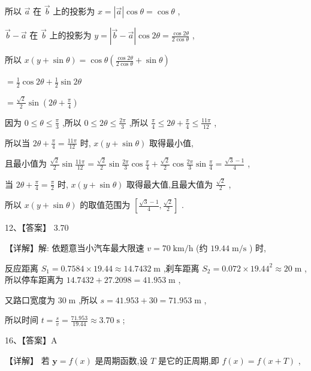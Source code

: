 \documentclass[10pt]{article}
\newcommand*\circled[1]{\tikz[baseline=(char.base)]{\node[shape=circle,draw,inner sep=1.5pt] (char) {\small #1};}}
\begin{document}
所以 \(\overrightarrow{a}\) 在 \(\overrightarrow{b}\) 上的投影为 \(x = \left| \overrightarrow{a}\right| \cos \theta  = \cos \theta\) ,

\(\overrightarrow{b} - \overrightarrow{a}\) 在 \(\overrightarrow{b}\) 上的投影为 \(y = \left| {\overrightarrow{b} - \overrightarrow{a}}\right| \cos {2\theta } = \frac{\cos {2\theta }}{2\cos \theta }\) ,

所以 \(x\left( {y + \sin \theta }\right)  = \cos \theta \left( {\frac{\cos {2\theta }}{2\cos \theta } + \sin \theta }\right)\)

\(= \frac{1}{2}\cos {2\theta } + \frac{1}{2}\sin {2\theta }\)

\(= \frac{\sqrt{2}}{2}\sin \left( {{2\theta } + \frac{\pi }{4}}\right)\)

因为 \(0 \leq  \theta  \leq  \frac{\pi }{3}\) ,所以 \(0 \leq  {2\theta } \leq  \frac{2\pi }{3}\) ,所以 \(\frac{\pi }{4} \leq  {2\theta } + \frac{\pi }{4} \leq  \frac{11\pi }{12}\) ,

所以当 \({2\theta } + \frac{\pi }{4} = \frac{11\pi }{12}\) 时, \(x\left( {y + \sin \theta }\right)\) 取得最小值,

且最小值为 \(\frac{\sqrt{2}}{2}\sin \frac{11\pi }{12} = \frac{\sqrt{2}}{2}\sin \frac{2\pi }{3}\cos \frac{\pi }{4} + \frac{\sqrt{2}}{2}\cos \frac{2\pi }{3}\sin \frac{\pi }{4} = \frac{\sqrt{3} - 1}{4}\) ,

当 \({2\theta } + \frac{\pi }{4} = \frac{\pi }{2}\) 时, \(x\left( {y + \sin \theta }\right)\) 取得最大值,且最大值为 \(\frac{\sqrt{2}}{2}\) ,

所以 \(x\left( {y + \sin \theta }\right)\) 的取值范围为 \(\left\lbrack  {\frac{\sqrt{3} - 1}{4},\frac{\sqrt{2}}{2}}\right\rbrack\) .

12、【答案】 3.70

【详解】解: 依题意当小汽车最大限速 \(v = {70}\mathrm{\;{km}}/\mathrm{h}\) (约 \({19.44}\mathrm{\;m}/\mathrm{s}\) ) 时,

反应距离 \({S}_{1} = {0.7584} \times  {19.44} \approx  {14.7432}\mathrm{\;m}\) ,刹车距离 \({S}_{2} = {0.072} \times  {19.44}^{2} \approx  {20}\mathrm{\;m}\) , 所以停车距离为 \({14.7432} + {27.2098} = {41.953}\mathrm{\;m}\) ,

又路口宽度为 \({30}\mathrm{\;m}\) ,所以 \(s = {41.953} + {30} = {71.953}\mathrm{\;m}\) ,

所以时间 \(t = \frac{s}{v} = \frac{71.953}{19.44} \approx  {3.70}\mathrm{\;s}\) ;

16、【答案】A

【详解】 \circled{1}  若 \(\mathbf{y} = f\left( x\right)\) 是周期函数,设 \(T\) 是它的正周期,即 \(f\left( x\right)  = f\left( {x + T}\right)\) ,
\end{document}
